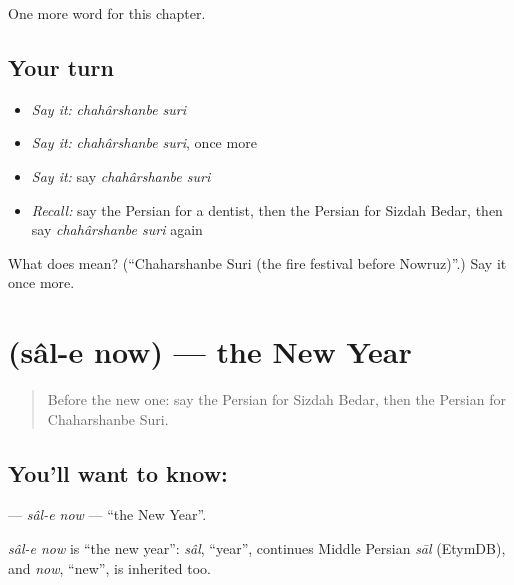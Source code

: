 \begin{grammarlens}[title={What you've built}]
One more word for this chapter.
\end{grammarlens}

\subsection*{Your turn}
\begin{itemize}
\raggedright
  \item \emph{Say it:} \emph{chahârshanbe suri}
  \item \emph{Say it:} \emph{chahârshanbe suri}, once more
  \item \emph{Say it:} say \emph{chahârshanbe suri}
  \item \emph{Recall:} say the Persian for a dentist, then the Persian for Sizdah Bedar, then say \emph{chahârshanbe suri} again
\end{itemize}

\begin{tcolorbox}[breakable,colback=teal!4,colframe=teal!35!black,title={Before you move on}]
What does   mean? (\textquotedblleft{}Chaharshanbe Suri (the fire festival before Nowruz)\textquotedblright{}.) Say it once more.
\end{tcolorbox}
\section[\texorpdfstring{\fa{سال} \fa{نو} (sâl-e now)}{سال نو (sâl-e now)}]{  (sâl-e now) — the New Year}

\label{lesson:FA-C228-sal-e-now}



\begin{quote}
Before the new one: say the Persian for Sizdah Bedar, then the Persian for Chaharshanbe Suri.
\end{quote}

\subsection*{You'll want to know:  }
\textbf{ } — \emph{sâl-e now} — \textquotedblleft{}the New Year\textquotedblright{}.

\begin{cousinweb}
\emph{sâl-e now} is \textquotedblleft{}the new year\textquotedblright{}: \emph{sâl}, \textquotedblleft{}year\textquotedblright{}, continues Middle Persian \emph{sāl} (EtymDB), and \emph{now}, \textquotedblleft{}new\textquotedblright{}, is inherited too.
\end{cousinweb}

